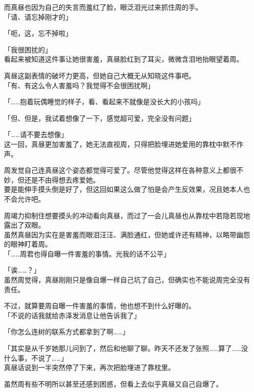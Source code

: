 而真昼也因为自己的失言而羞红了脸，眼泛泪光过来抓住周的手。\\

「请、请忘掉刚才的」

「呃，这，忘不掉啦」

「我很困扰的」\\

看起来被知道这件事让她很害羞，真昼脸红到了耳尖，微微含泪地抬眼望着周。

真昼这副表情的破坏力更高，但她自己大概无从知晓这件事吧。\\

「有、有这么令人害羞吗？我觉得不会很困扰啊」

「……抱着玩偶睡觉的样子，看、看起来不就像是没长大的小孩吗」

「但、但是，我试着想像了一下，感觉超可爱，完全没有问题」

「……请不要去想像」\\

这一回，真昼更加害羞了，她无法直视周，只得把脸埋进她爱用的靠枕中默不作声。

周发觉自己连真昼这个姿态都觉得可爱了。尽管他觉得这样在各种意义上都很不妙，但还是不由得想去疼爱她。\\

要是能伸手摸头倒是好了，但这回如果这么做了怕是会产生反效果，况且她本人也不会允许吧。

周竭力抑制住想要摸头的冲动看向真昼，而过了一会儿真昼也从靠枕中若隐若现地露出了双眼。\\

虽然真昼因为实在是害羞而眼泪汪汪、满脸通红，但她或许还有精神，以略带幽怨的眼神盯着周。\\%

「……周君也得自曝一件害羞的事情。光我的话不公平」

「诶……？」\\

虽然周觉得，真昼刚刚只是像自爆一样自己坑了自己，但确实也不能说周完全没有责任。

不过，就算要周自曝一件害羞的事情，他也想不到什么好曝的。\\

「不说的话我就给赤泽发消息让他告诉我了」

「你怎么连树的联系方式都拿到了啊……」

「其实是从千岁她那儿问到了，然后和他聊了聊。昨天不还发了张照……算了……没什么事，不说了……」\\

真昼话说到一半突然停了下来，再次把脸埋进了靠枕里。

虽然周有些不明所以甚至还感到困惑，但看上去似乎真昼又自己自爆了。

